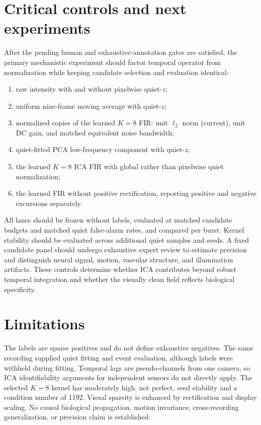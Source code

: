 \documentclass[11pt]{article}
\begin{document}
\section{Critical controls and next experiments}
After the pending human and exhaustive-annotation gates are satisfied, the
primary mechanistic experiment should factor temporal operator from
normalization while keeping candidate selection and evaluation identical:
\begin{enumerate}
\item raw intensity with and without pixelwise quiet-$z$;
\item uniform nine-frame moving average with quiet-$z$;
\item normalized copies of the learned $K=8$ FIR: unit $\ell_2$ norm (current), unit DC gain, and matched equivalent noise bandwidth;
\item quiet-fitted PCA low-frequency component with quiet-$z$;
\item the learned $K=8$ ICA FIR with global rather than pixelwise quiet normalization;
\item the learned FIR without positive rectification, reporting positive and negative excursions separately.
\end{enumerate}
All lanes should be frozen without labels, evaluated at matched candidate budgets and matched quiet false-alarm rates, and compared per burst. Kernel stability should be evaluated across additional quiet samples and seeds. A fixed candidate panel should undergo exhaustive expert review to estimate precision and distinguish neural signal, motion, vascular structure, and illumination artifacts. These controls determine whether ICA contributes beyond robust temporal integration and whether the visually clean field reflects biological specificity.


\section{Limitations}
The labels are sparse positives and do not define exhaustive negatives. The same recording supplied quiet fitting and event evaluation, although labels were withheld during fitting. Temporal lags are pseudo-channels from one camera, so ICA identifiability arguments for independent sensors do not directly apply. The selected $K=8$ kernel has moderately high, not perfect, seed stability and a condition number of 1192. Visual sparsity is enhanced by rectification and display scaling. No causal biological propagation, motion invariance, cross-recording generalization, or precision claim is established.
\end{document}
